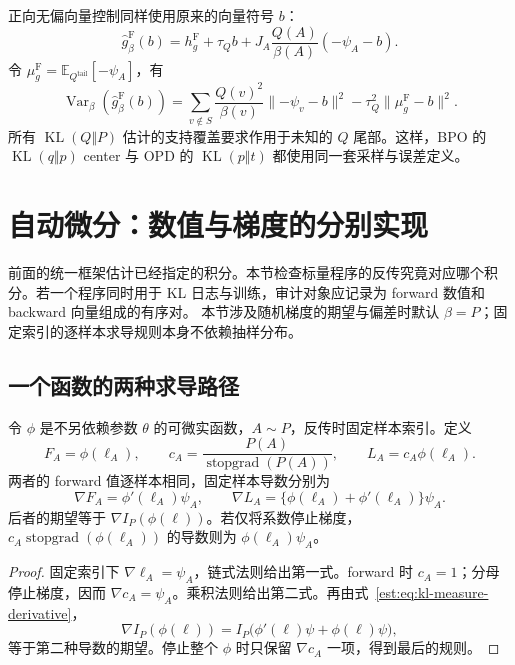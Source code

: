 \documentclass[lang=cn,scheme=chinese,openany]{../book/elegantbook}
\newcommand{\E}{\mathbb E}
\newcommand{\KL}{\operatorname{KL}}
\newcommand{\Var}{\operatorname{Var}}
\newcommand{\sg}{\operatorname{stopgrad}}
\newcommand{\tail}{\mathrm{tail}}
\begin{document}
正向无偏向量控制同样使用原来的向量符号 $b$：
\begin{equation*}
 \widehat g^{\mathrm F}_\beta(b)
 =h_g^{\mathrm F}+\tau_Qb
   +J_A\frac{Q(A)}{\beta(A)}(-\psi_A-b).
\end{equation*}
令 $\mu_g^{\mathrm F}=\E_{Q^{\tail}}[-\psi_A]$，有
\begin{equation*}
 \Var_\beta(\widehat g^{\mathrm F}_\beta(b))
 =\sum_{v\notin S}\frac{Q(v)^2}{\beta(v)}\lVert-\psi_v-b\rVert^2
  -\tau_Q^2\lVert\mu_g^{\mathrm F}-b\rVert^2.
\end{equation*}
所有 $\KL(Q\Vert P)$ 估计的支持覆盖要求作用于未知的 $Q$ 尾部。这样，BPO 的 $\KL(q\Vert p)$ center 与 OPD 的 $\KL(p\Vert t)$ 都使用同一套采样与误差定义。



\section{自动微分：数值与梯度的分别实现}
\label{est:sec:kl-autodiff}
前面的统一框架估计已经指定的积分。本节检查标量程序的反传究竟对应哪个积分。若一个程序同时用于 KL 日志与训练，审计对象应记录为 forward 数值和 backward 向量组成的有序对。
本节涉及随机梯度的期望与偏差时默认 $\beta=P$；固定索引的逐样本求导规则本身不依赖抽样分布。

\subsection{一个函数的两种求导路径}

\begin{theorem}[固定样本反传与采样测度补偿]
\label{est:thm:kl-autodiff-transform}
令 $\phi$ 是不另依赖参数 $\theta$ 的可微实函数，$A\sim P$，反传时固定样本索引。定义
\begin{equation*}
 F_A=\phi(\ell_A),\qquad
 c_A=\frac{P(A)}{\sg(P(A))},\qquad
 L_A=c_A\phi(\ell_A).
\end{equation*}
两者的 forward 值逐样本相同，固定样本导数分别为
\begin{equation*}
 \nabla F_A=\phi'(\ell_A)\psi_A,\qquad
 \nabla L_A=\{\phi(\ell_A)+\phi'(\ell_A)\}\psi_A.
\end{equation*}
后者的期望等于 $\nabla I_P(\phi(\ell))$。若仅将系数停止梯度，$c_A\sg(\phi(\ell_A))$ 的导数则为 $\phi(\ell_A)\psi_A$。
\end{theorem}

\begin{proof}
固定索引下 $\nabla \ell_A=\psi_A$，链式法则给出第一式。forward 时 $c_A=1$；分母停止梯度，因而 $\nabla c_A=\psi_A$。乘积法则给出第二式。再由式~\eqref{est:eq:kl-measure-derivative}，
\begin{equation*}
 \nabla I_P(\phi(\ell))
 =I_P\bigl(\phi'(\ell)\psi+\phi(\ell)\psi\bigr),
\end{equation*}
等于第二种导数的期望。停止整个 $\phi$ 时只保留 $\nabla c_A$ 一项，得到最后的规则。
\end{proof}
\end{document}
